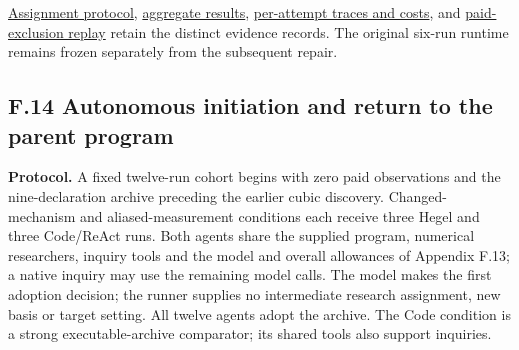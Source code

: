 \documentclass[twoside,11pt]{article}
\begin{document}
\hyperlink{artifact-107}{Assignment protocol}, \hyperlink{artifact-108}{aggregate results}, \hyperlink{artifact-109}{per-attempt traces and costs}, and \hyperlink{artifact-110}{paid-exclusion replay} retain the distinct evidence records. The original six-run runtime remains frozen separately from the subsequent repair.


\subsection*{F.14 Autonomous initiation and return to the parent program}

\textbf{Protocol.} A fixed twelve-run cohort begins with zero paid observations and the nine-declaration archive preceding the earlier cubic discovery. Changed-mechanism and aliased-measurement conditions each receive three Hegel and three Code/ReAct runs. Both agents share the supplied program, numerical researchers, inquiry tools and the model and overall allowances of Appendix F.13; a native inquiry may use the remaining model calls. The model makes the first adoption decision; the runner supplies no intermediate research assignment, new basis or target setting. All twelve agents adopt the archive. The Code condition is a strong executable-archive comparator; its shared tools also support inquiries.
\end{document}
